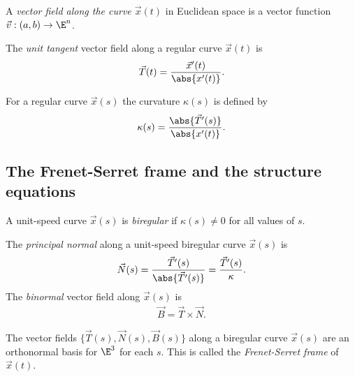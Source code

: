 \documentclass{article}
\begin{document}
\begin{definition}
    A \emph{vector field along the curve $\vec x(t)$} in Euclidean space is a vector
    function $\vec v:(a,b)\to\E^n$.
\end{definition}

\begin{definition}
    The \emph{unit tangent} vector field along a regular curve $\vec x(t)$ is
    \begin{align*}
        \vec T(t) = \frac{\vec x'(t)}{\abs{x'(t)}}.
    \end{align*}
\end{definition}

\begin{definition}
    For a regular curve $\vec x(s)$ the curvature $\kappa(s)$ is defined by
    \begin{align*}
        \kappa(s) = \frac{\abs{\vec T'(s)}}{\abs{x'(t)}}.
    \end{align*}
\end{definition}

\subsection{The Frenet-Serret frame and the structure equations}

\begin{definition}
    A unit-speed curve $\vec x(s)$ is \emph{biregular} if $\kappa(s)\not=0$ for
    all values of $s$.
\end{definition}

\begin{definition}
    The \emph{principal normal} along a unit-speed biregular curve $\vec x(s)$ is
    \begin{align*}
        \vec N(s) = \frac{\vec T'(s)}{\abs{\vec T'(s)}}=\frac{\vec T'(s)}{\kappa}.
    \end{align*}
    The \emph{binormal} vector field along $\vec x(s)$ is
    \begin{align*}
        \vec B = \vec T \times \vec N.
    \end{align*}
\end{definition}

\begin{proposition}[Notes 3.14]
    The vector fields $\{\vec T(s), \vec N(s), \vec B(s)\}$ along a biregular curve
    $\vec x(s)$ are an orthonormal basis for $\E^3$ for each $s$. This is called the
    \emph{Frenet-Serret frame} of $\vec x(t)$.
\end{proposition}
\end{document}
